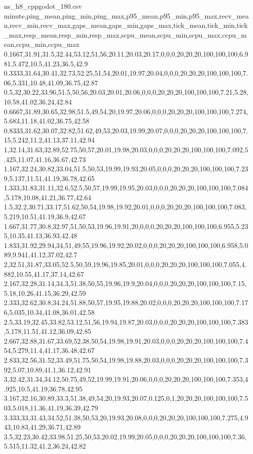 \begin{filecontents*}[overwrite]{ns_h8_cppgodot_180.csv}
minute,ping_mean,ping_min,ping_max,p95_mean,p95_min,p95_max,recv_mean,recv_min,recv_max,gaps_mean,gaps_min,gaps_max,tick_mean,tick_min,tick_max,resp_mean,resp_min,resp_max,scpu_mean,scpu_min,scpu_max,ccpu_mean,ccpu_min,ccpu_max
0.1667,31.91,31.5,32.44,53.12,51,56,20.11,20.03,20.17,0,0,0,20,20,20,100,100,100,6.981,5.472,10.5,41.23,36.5,42.9
0.3333,31.64,30.41,32.73,52.25,51,54,20.01,19.97,20.04,0,0,0,20,20,20,100,100,100,7.06,5.331,10.48,41.09,36.75,42.87
0.5,32,30.22,33.96,51.5,50,56,20.03,20.01,20.06,0,0,0,20,20,20,100,100,100,7.21,5.28,10.58,41.02,36.24,42.84
0.6667,31.89,30.65,32.98,51.5,49,54,20,19.97,20.06,0,0,0,20,20,20,100,100,100,7.274,5.683,11.18,41.02,36.75,42.58
0.8333,31.62,30.07,32.82,51.62,49,53,20.03,19.99,20.07,0,0,0,20,20,20,100,100,100,7.15,5.242,11.2,41.13,37.11,42.94
1,32.14,31.63,32.89,52.75,50,57,20.01,19.98,20.03,0,0,0,20,20,20,100,100,100,7.092,5.425,11.07,41.16,36.67,42.73
1.167,32.24,30.82,33.04,51.5,50,53,19.99,19.93,20.05,0,0,0,20,20,20,100,100,100,7.239,5.137,11.51,41.19,36.78,42.65
1.333,31.83,31.11,32.6,52.5,50,57,19.99,19.95,20.03,0,0,0,20,20,20,100,100,100,7.084,5.178,10.08,41.21,36.77,42.64
1.5,32.2,30.71,33.17,51.62,50,54,19.98,19.92,20.01,0,0,0,20,20,20,100,100,100,7.083,5.219,10.51,41.19,36.9,42.67
1.667,31.77,30.8,32.97,51,50,53,19.96,19.91,20,0,0,0,20,20,20,100,100,100,6.955,5.235,10.35,41.13,36.93,42.48
1.833,31.92,29.94,34,51,49,55,19.96,19.92,20.02,0,0,0,20,20,20,100,100,100,6.958,5.089,9.941,41.12,37.02,42.7
2,32.51,31.87,33.05,52.5,50,59,19.96,19.85,20.01,0,0,0,20,20,20,100,100,100,7.055,4.882,10.55,41.17,37.14,42.67
2.167,32.28,31.14,34.3,51.38,50,55,19.96,19.9,20.04,0,0,0,20,20,20,100,100,100,7.15,5.18,10.26,41.15,36.29,42.59
2.333,32.62,30.8,34.24,51.88,50,57,19.95,19.88,20.02,0,0,0,20,20,20,100,100,100,7.176,5.035,10.34,41.08,36.01,42.58
2.5,33.19,32.45,33.82,53.12,51,56,19.94,19.87,20.03,0,0,0,20,20,20,100,100,100,7.383,5.178,11.51,41.12,36.09,42.85
2.667,32.88,31.67,33.69,52.38,50,54,19.98,19.91,20.03,0,0,0,20,20,20,100,100,100,7.454,5.279,11.4,41.17,36.48,42.67
2.833,32.56,31.52,33.49,51.75,50,54,19.98,19.88,20.03,0,0,0,20,20,20,100,100,100,7.392,5.07,10.89,41.1,36.12,42.91
3,32.42,31.34,34.12,50.75,49,52,19.99,19.91,20.06,0,0,0,20,20,20,100,100,100,7.353,4.925,10.5,41.19,36.78,42.95
3.167,32.16,30.89,33.3,51.38,49,54,20,19.93,20.07,0.125,0,1,20,20,20,100,100,100,7.503,5.018,11.36,41.19,36.39,42.79
3.333,33,31.43,34.52,51.38,50,53,20,19.93,20.08,0,0,0,20,20,20,100,100,100,7.275,4.943,10.83,41.29,36.71,42.89
3.5,32.23,30.42,33.98,51.25,50,53,20.02,19.99,20.05,0,0,0,20,20,20,100,100,100,7.36,5.515,11.32,41.2,36.24,42.82

\end{filecontents*}
